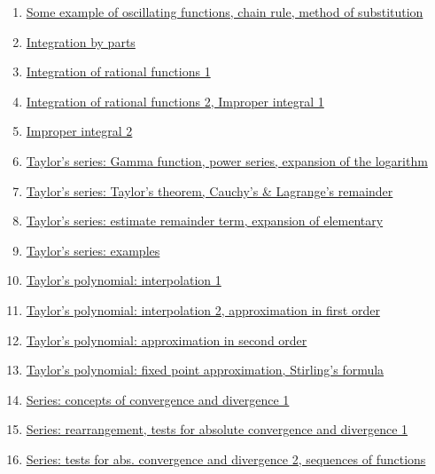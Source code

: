 \documentclass[11pt]{article}
\begin{document}
\begin{enumerate}
	\item \href{https://mp.weixin.qq.com/s/fvxg2mLtSSM8Gyo4wRrRfQ}{Some example of oscillating functions, chain rule, method of substitution}	%
	\item \href{https://mp.weixin.qq.com/s/1_BBnHcpBOr5QwzhCMS2Jw}{Integration by parts}	%
	\item \href{https://mp.weixin.qq.com/s/Ei7SnZWqDcaStALEiaigBA}{Integration of rational functions 1}	%
	\item \href{https://mp.weixin.qq.com/s/18XRgIGhs7i-qkrp3OZTyA}{Integration of rational functions 2, Improper integral 1}	%
	\item \href{https://mp.weixin.qq.com/s/1HyKxNFDCccuQr07KC-UXA}{Improper integral 2}	%
	\item \href{https://mp.weixin.qq.com/s/8XoyA4tGn1KwGNxWmuNbYw}{Taylor's series: Gamma function, power series, expansion of the logarithm}	%
	\item \href{https://mp.weixin.qq.com/s/ho7_hB0jR7bNepTmeIjNdQ}{Taylor's series: Taylor's theorem, Cauchy's \& Lagrange's remainder}	%
	\item \href{https://mp.weixin.qq.com/s/9E9eGleHOtv7ovy1lUcLrA}{Taylor's series: estimate remainder term, expansion of elementary}	%
	\item \href{https://mp.weixin.qq.com/s/P4GEHqjFht-kRQl4qeW0VA}{Taylor's series: examples}	%
	\item \href{https://mp.weixin.qq.com/s/Eufsx2R4xi-2LIb218vkSw}{Taylor's polynomial: interpolation 1}	%
	\item \href{https://mp.weixin.qq.com/s/nCIjtbgzz893SbNFfR-NTw}{Taylor's polynomial: interpolation 2, approximation in first order}	%
	\item \href{https://mp.weixin.qq.com/s/ua3ZGUI0M8ChNP_hpEQ6hg}{Taylor's polynomial: approximation in second order}	%
	\item \href{https://mp.weixin.qq.com/s/C5su0-glrDMnWzU9VdTsEw}{Taylor's polynomial: fixed point approximation, Stirling's formula}	%
	\item \href{https://mp.weixin.qq.com/s/MFMIa3EkvjOm7V70XUG37A}{Series: concepts of convergence and divergence 1}	%
	\item \href{https://mp.weixin.qq.com/s/AVwjWW5NBDDHgkRsnOmoNQ}{Series: rearrangement, tests for absolute convergence and divergence 1}	%
	\item \href{https://mp.weixin.qq.com/s/Tjw9T4Bcqb0LB7VKhAItDA}{Series: tests for abs. convergence and divergence 2, sequences of functions}	%

\end{enumerate}
\end{document}

